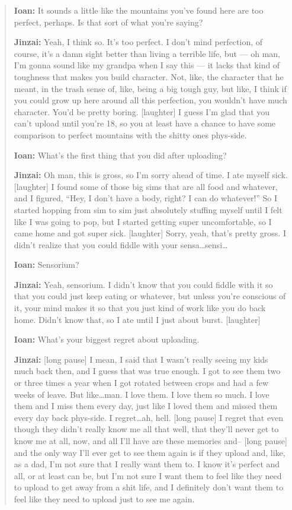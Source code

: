 \begin{quote}
\textbf{Ioan:} It sounds a little like the mountains you've found here are too perfect, perhaps. Is that sort of what you're saying?

\textbf{Jinzai:} Yeah, I think so. It's too perfect. I don't mind perfection, of course, it's a damn sight better than living a terrible life, but — oh man, I'm gonna sound like my grandpa when I say this — it lacks that kind of toughness that makes you build character. Not, like, the character that he meant, in the trash sense of, like, being a big tough guy, but like, I think if you could grow up here around all this perfection, you wouldn't have much character. You'd be pretty boring. {[}laughter{]} I guess I'm glad that you can't upload until you're 18, so you at least have a chance to have some comparison to perfect mountains with the shitty ones phys-side.

\textbf{Ioan:} What's the first thing that you did after uploading?

\textbf{Jinzai:} Oh man, this is gross, so I'm sorry ahead of time. I ate myself sick. {[}laughter{]} I found some of those big sims that are all food and whatever, and I figured, ``Hey, I don't have a body, right? I can do whatever!'' So I started hopping from sim to sim just absolutely stuffing myself until I felt like I was going to pop, but I started getting super uncomfortable, so I came home and got super sick. {[}laughter{]} Sorry, yeah, that's pretty gross. I didn't realize that you could fiddle with your sensa\ldots sensi\ldots{}

\textbf{Ioan:} Sensorium?

\textbf{Jinzai:} Yeah, sensorium. I didn't know that you could fiddle with it so that you could just keep eating or whatever, but unless you're conscious of it, your mind makes it so that you just kind of work like you do back home. Didn't know that, so I ate until I just about burst. {[}laughter{]}

\textbf{Ioan:} What's your biggest regret about uploading.

\textbf{Jinzai:} {[}long pause{]} I mean, I said that I wasn't really seeing my kids much back then, and I guess that was true enough. I got to see them two or three times a year when I got rotated between crops and had a few weeks of leave. But like\ldots man. I love them. I love them so much. I love them and I miss them every day, just like I loved them and missed them every day back phys-side. I regret\ldots ah, hell. {[}long pause{]} I regret that even though they didn't really know me all that well, that they'll never get to know me at all, now, and all I'll have are these memories and-- {[}long pause{]} and the only way I'll ever get to see them again is if they upload and, like, as a dad, I'm not sure that I really want them to. I know it's perfect and all, or at least can be, but I'm not sure I want them to feel like they need to upload to get away from a shit life, and I definitely don't want them to feel like they need to upload just to see me again.
\end{quote}

